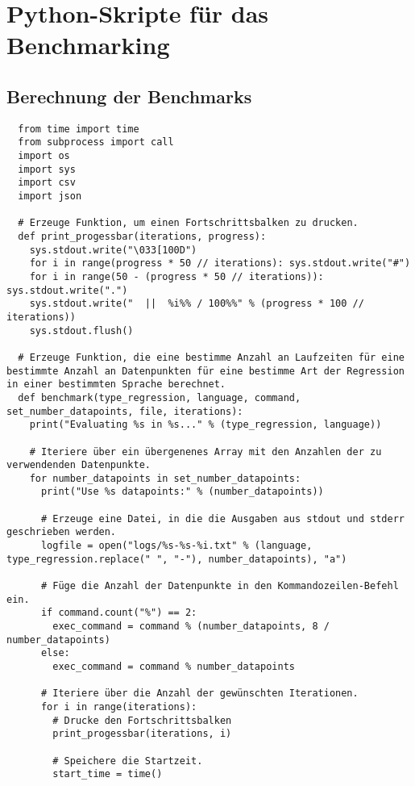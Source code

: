 \chapter{Python-Skripte für das Benchmarking}
\label{appendix:F}

\section{Berechnung der Benchmarks}
\label{appendix:F:1}

\begin{verbatim}
  from time import time
  from subprocess import call
  import os
  import sys
  import csv
  import json

  # Erzeuge Funktion, um einen Fortschrittsbalken zu drucken.
  def print_progessbar(iterations, progress):
    sys.stdout.write("\033[100D")
    for i in range(progress * 50 // iterations): sys.stdout.write("#")
    for i in range(50 - (progress * 50 // iterations)): sys.stdout.write(".")
    sys.stdout.write("  ||  %i%% / 100%%" % (progress * 100 // iterations))
    sys.stdout.flush()

  # Erzeuge Funktion, die eine bestimme Anzahl an Laufzeiten für eine bestimmte Anzahl an Datenpunkten für eine bestimme Art der Regression in einer bestimmten Sprache berechnet.
  def benchmark(type_regression, language, command, set_number_datapoints, file, iterations):
    print("Evaluating %s in %s..." % (type_regression, language))

    # Iteriere über ein übergenenes Array mit den Anzahlen der zu verwendenden Datenpunkte.
    for number_datapoints in set_number_datapoints:
      print("Use %s datapoints:" % (number_datapoints))

      # Erzeuge eine Datei, in die die Ausgaben aus stdout und stderr geschrieben werden.
      logfile = open("logs/%s-%s-%i.txt" % (language, type_regression.replace(" ", "-"), number_datapoints), "a")

      # Füge die Anzahl der Datenpunkte in den Kommandozeilen-Befehl ein.
      if command.count("%") == 2:
        exec_command = command % (number_datapoints, 8 / number_datapoints)
      else:
        exec_command = command % number_datapoints

      # Iteriere über die Anzahl der gewünschten Iterationen.
      for i in range(iterations):
        # Drucke den Fortschrittsbalken
        print_progessbar(iterations, i)

        # Speichere die Startzeit.
        start_time = time()


\end{verbatim}
